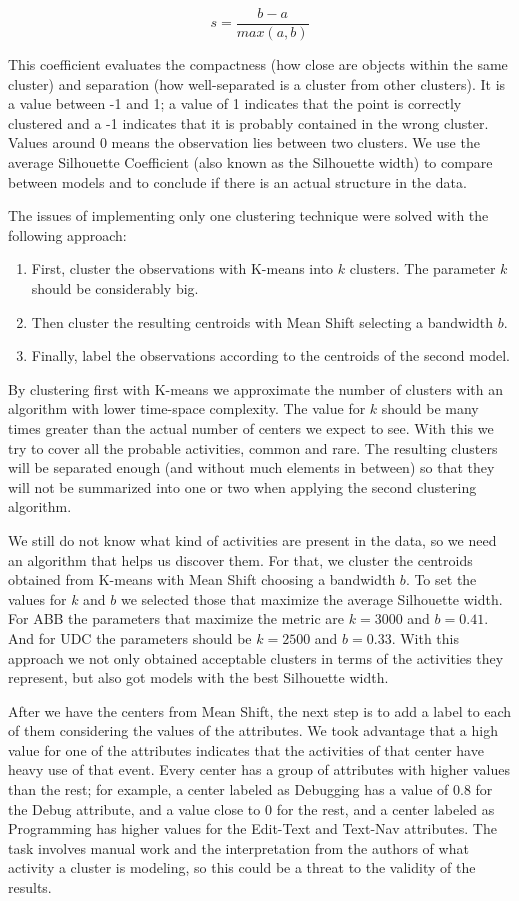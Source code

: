 \documentclass[conference]{IEEEtran}
\begin{document}
$$s = \frac{b-a}{max(a,b)}$$

This coefficient evaluates the compactness (how close are objects within the same cluster) and separation (how well-separated is a cluster from other clusters). It is a value between -1 and 1; a value of 1 indicates that the point is correctly clustered and a -1 indicates that it is probably contained in the wrong cluster. Values around 0 means the observation lies between two clusters. We use the average Silhouette Coefficient (also known as the Silhouette width) to compare between models and to conclude if there is an actual structure in the data.

The issues of implementing only one clustering technique were solved with the following approach:

\begin{enumerate}
	\item First, cluster the observations with K-means into $k$ clusters. The parameter $k$ should be considerably big.
	\item Then cluster the resulting centroids with Mean Shift selecting a bandwidth $b$.
	\item Finally, label the observations according to the centroids of the second model.
\end{enumerate}

By clustering first with K-means we approximate the number of clusters with an algorithm with lower time-space complexity. The value for $k$ should be many times greater than the actual number of centers we expect to see. With this we try to cover all the probable activities, common and rare. The resulting clusters will be separated enough (and without much elements in between) so that they will not be summarized into one or two when applying the second clustering algorithm.

We still do not know what kind of activities are present in the data, so we need an algorithm that helps us discover them. For that, we cluster the centroids obtained from K-means with Mean Shift choosing a bandwidth $b$. To set the values for $k$ and $b$ we selected those that maximize the average Silhouette width. For ABB the parameters that maximize the metric are $k=3000$ and $b=0.41$. And for UDC the parameters should be $k=2500$ and $b=0.33$. With this approach we not only obtained acceptable clusters in terms of the activities they represent, but also got models with the best Silhouette width.

After we have the centers from Mean Shift, the next step is to add a label to each of them considering the values of the attributes. We took advantage that a high value for one of the attributes indicates that the activities of that center have heavy use of that event. Every center has a group of attributes with higher values than the rest; for example, a center labeled as Debugging has a value of 0.8 for the Debug attribute, and a value close to 0 for the rest, and a center labeled as Programming has higher values for the Edit-Text and Text-Nav attributes. The task involves manual work and the interpretation from the authors of what activity a cluster is modeling, so this could be a threat to the validity of the results. 
\end{document}
